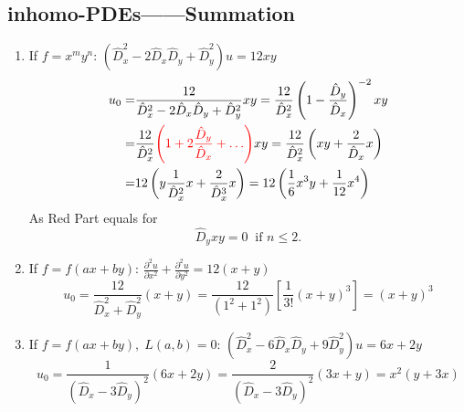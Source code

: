 \documentclass[10pt, a4paper, oneside]{ctexbook}
\begin{document}
\subsection{inhomo-PDEs——Summation}
\begin{enumerate}
    \item If $f=x^my^n$: $\left(\hat{D}_{x}^{2}-2 \hat{D}_{x} \hat{D}_{y}+\hat{D}_{y}^{2}\right) u=12 x y$
          $$
              \begin{aligned}
                  u_{0}= & \frac{12}{\hat{D}_{x}^{2}-2 \hat{D}_{x} \hat{D}_{y}+\hat{D}_{y}^{2}} x y=\frac{12}{\hat{D}_{x}^{2}}\left(1-\frac{\hat{D}_{y}}{\hat{D}_{x}}\right)^{-2} x y             \\
                  =      & \frac{12}{\hat{D}_{x}^{2}}{\color{red} \left(1+2 \frac{\hat{D}_{y}}{\hat{D}_{x}}+\ldots\right)} x y=\frac{12}{\hat{D}_{x}^{2}}\left(x y+\frac{2}{\hat{D}_{x}} x\right) \\
                  =      & 12\left(y \frac{1}{\hat{D}_{x}^{2}} x+\frac{2}{\hat{D}_{x}^{3}} x\right)=12\left(\frac{1}{6} x^{3} y+\frac{1}{12} x^{4}\right)
              \end{aligned}
          $$
          As {\color{red} Red Part} equals for
          $$
              \hat{D}_y xy = 0 \;\; \text{if $n \le 2$}.
          $$
    \item If $f=f(ax+by)$: $\frac{\partial^2 u}{\partial x^2} + \frac{\partial^2 u}{\partial y^2} = 12(x+y)$
          $$
              u_{0}=\frac{12}{\hat{D}_{x}^{2}+\hat{D}_{y}^{2}}(x+y)=\frac{12}{\left(1^{2}+1^{2}\right)}\left[\frac{1}{3 !}(x+y)^{3}\right]=(x+y)^{3}
          $$
    \item If $f=f(ax+by),\; L(a,b)=0$: $
              \left(\hat{D}_{x}^{2}-6 \hat{D}_{x} \hat{D}_{y}+9 \hat{D}_{y}^{2}\right) u=6 x+2 y$
          $$
              u_{0}=\frac{1}{\left(\hat{D}_{x}-3 \hat{D}_{y}\right)^{2}}(6 x+2 y)=\frac{2}{\left(\hat{D}_{x}-3 \hat{D}_{y}\right)^{2}}(3 x+y)=x^{2}(y+3 x)
          $$
\end{enumerate}
\end{document}
